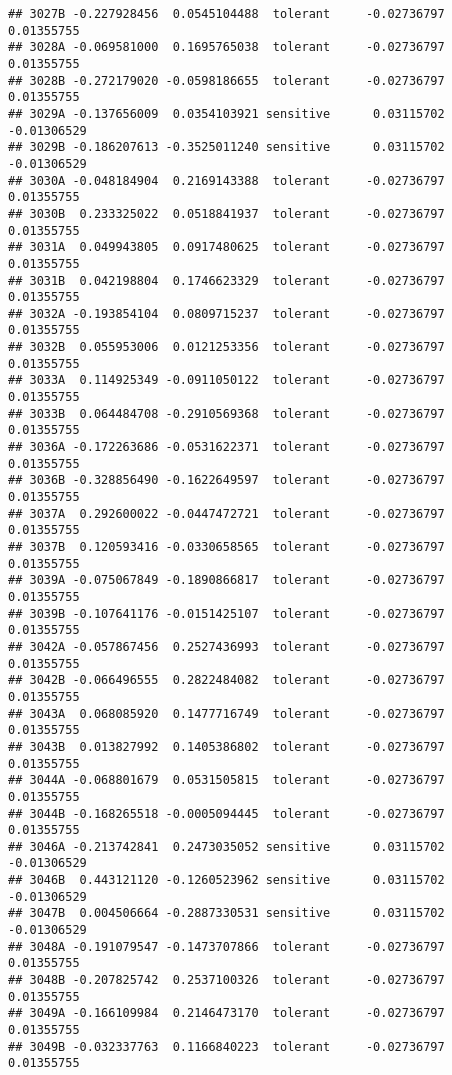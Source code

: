 \documentclass[
]{article}
\begin{document}
\begin{verbatim}
## 3027B -0.227928456  0.0545104488  tolerant     -0.02736797      0.01355755
## 3028A -0.069581000  0.1695765038  tolerant     -0.02736797      0.01355755
## 3028B -0.272179020 -0.0598186655  tolerant     -0.02736797      0.01355755
## 3029A -0.137656009  0.0354103921 sensitive      0.03115702     -0.01306529
## 3029B -0.186207613 -0.3525011240 sensitive      0.03115702     -0.01306529
## 3030A -0.048184904  0.2169143388  tolerant     -0.02736797      0.01355755
## 3030B  0.233325022  0.0518841937  tolerant     -0.02736797      0.01355755
## 3031A  0.049943805  0.0917480625  tolerant     -0.02736797      0.01355755
## 3031B  0.042198804  0.1746623329  tolerant     -0.02736797      0.01355755
## 3032A -0.193854104  0.0809715237  tolerant     -0.02736797      0.01355755
## 3032B  0.055953006  0.0121253356  tolerant     -0.02736797      0.01355755
## 3033A  0.114925349 -0.0911050122  tolerant     -0.02736797      0.01355755
## 3033B  0.064484708 -0.2910569368  tolerant     -0.02736797      0.01355755
## 3036A -0.172263686 -0.0531622371  tolerant     -0.02736797      0.01355755
## 3036B -0.328856490 -0.1622649597  tolerant     -0.02736797      0.01355755
## 3037A  0.292600022 -0.0447472721  tolerant     -0.02736797      0.01355755
## 3037B  0.120593416 -0.0330658565  tolerant     -0.02736797      0.01355755
## 3039A -0.075067849 -0.1890866817  tolerant     -0.02736797      0.01355755
## 3039B -0.107641176 -0.0151425107  tolerant     -0.02736797      0.01355755
## 3042A -0.057867456  0.2527436993  tolerant     -0.02736797      0.01355755
## 3042B -0.066496555  0.2822484082  tolerant     -0.02736797      0.01355755
## 3043A  0.068085920  0.1477716749  tolerant     -0.02736797      0.01355755
## 3043B  0.013827992  0.1405386802  tolerant     -0.02736797      0.01355755
## 3044A -0.068801679  0.0531505815  tolerant     -0.02736797      0.01355755
## 3044B -0.168265518 -0.0005094445  tolerant     -0.02736797      0.01355755
## 3046A -0.213742841  0.2473035052 sensitive      0.03115702     -0.01306529
## 3046B  0.443121120 -0.1260523962 sensitive      0.03115702     -0.01306529
## 3047B  0.004506664 -0.2887330531 sensitive      0.03115702     -0.01306529
## 3048A -0.191079547 -0.1473707866  tolerant     -0.02736797      0.01355755
## 3048B -0.207825742  0.2537100326  tolerant     -0.02736797      0.01355755
## 3049A -0.166109984  0.2146473170  tolerant     -0.02736797      0.01355755
## 3049B -0.032337763  0.1166840223  tolerant     -0.02736797      0.01355755
\end{verbatim}
\end{document}

